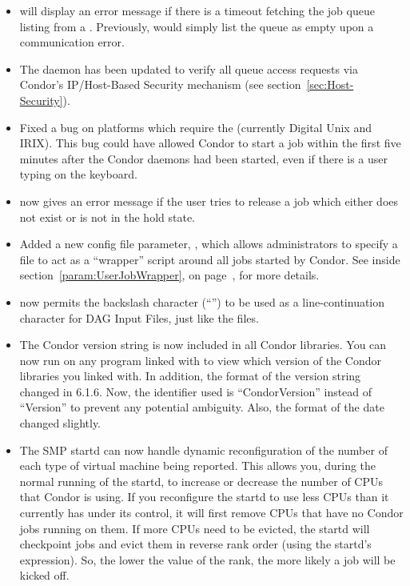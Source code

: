 \begin{itemize}
\item {} will display an error message if there is a timeout
fetching the job queue listing from a .  Previously,
 would simply list the queue as empty upon a communication error.

\item The  daemon has been updated to verify all queue access
requests via Condor's IP/Host-Based Security mechanism (see
section~\ref{sec:Host-Security}).

\item Fixed a bug on platforms which require the  (currently
Digital Unix and IRIX).  
This bug could have allowed Condor to start a job within the first five
minutes after the Condor daemons had been started, even if there is a user
typing on the keyboard.

\item {} now gives an error message if the user tries to
release a job which either does not exist or is not in the hold state.

\item Added a new config file parameter, , which
allows administrators to specify a file to act as a ``wrapper'' script
around all jobs started by Condor. 
See inside section~\ref{param:UserJobWrapper}, on 
page~\pageref{sec:Starter-Config-File-Entries}, for more details.

\item {} now permits the backslash character (``\Bs'') to be used
as a line-continuation character for DAG Input Files, just like the
 files.

\item The Condor version string is now included in all Condor
libraries.
You can now run  on any program linked with
 to view which version of the Condor libraries you
linked with.
In addition, the format of the version string changed in 6.1.6.
Now, the identifier used is ``CondorVersion'' instead of ``Version''
to prevent any potential ambiguity.
Also, the format of the date changed slightly.

\item The SMP startd can now handle dynamic reconfiguration of the
number of each type of virtual machine being reported.
This allows you, during the normal running of the startd, to increase
or decrease the number of CPUs that Condor is using.
If you reconfigure the startd to use less CPUs than it currently has
under its control, it will first remove CPUs that have no Condor jobs
running on them.
If more CPUs need to be evicted, the startd will checkpoint jobs and
evict them in reverse rank order (using the startd's 
expression).
So, the lower the value of the rank, the more likely a job will be
kicked off.


\end{itemize}
